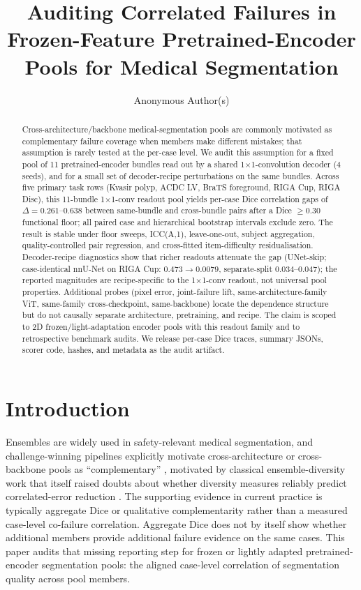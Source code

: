 \documentclass{article}
\title{Auditing Correlated Failures in Frozen-Feature Pretrained-Encoder Pools for Medical Segmentation}
\author{Anonymous Author(s)}
\begin{document}
\maketitle

\begin{abstract}
Cross-architecture/backbone medical-segmentation pools are commonly motivated as complementary failure coverage when members make different mistakes; that assumption is rarely tested at the per-case level. We audit this assumption for a fixed pool of 11 pretrained-encoder bundles read out by a shared 1$\times$1-convolution decoder (4 seeds), and for a small set of decoder-recipe perturbations on the same bundles. Across five primary task rows (Kvasir polyp, ACDC LV, BraTS foreground, RIGA Cup, RIGA Disc), this 11-bundle 1$\times$1-conv readout pool yields per-case Dice correlation gaps of $\Delta=0.261$--$0.638$ between same-bundle and cross-bundle pairs after a Dice $\geq 0.30$ functional floor; all paired case and hierarchical bootstrap intervals exclude zero. The result is stable under floor sweeps, ICC(A,1), leave-one-out, subject aggregation, quality-controlled pair regression, and cross-fitted item-difficulty residualisation. Decoder-recipe diagnostics show that richer readouts attenuate the gap (UNet-skip; case-identical nnU-Net on RIGA Cup: $0.473\!\to\!0.0079$, separate-split $0.034$--$0.047$); the reported magnitudes are recipe-specific to the 1$\times$1-conv readout, not universal pool properties. Additional probes (pixel error, joint-failure lift, same-architecture-family ViT, same-family cross-checkpoint, same-backbone) locate the dependence structure but do not causally separate architecture, pretraining, and recipe. The claim is scoped to 2D frozen/light-adaptation encoder pools with this readout family and to retrospective benchmark audits. We release per-case Dice traces, summary JSONs, scorer code, hashes, and metadata as the audit artifact.
\end{abstract}

\section{Introduction}

Ensembles are widely used in safety-relevant medical segmentation, and challenge-winning pipelines explicitly motivate cross-architecture or cross-backbone pools as ``complementary'' \citep{ferreira2024brats,luo2025elf}, motivated by classical ensemble-diversity work that itself raised doubts about whether diversity measures reliably predict correlated-error reduction \citep{kuncheva2003diversity}. The supporting evidence in current practice is typically aggregate Dice or qualitative complementarity rather than a measured case-level co-failure correlation. Aggregate Dice does not by itself show whether additional members provide additional failure evidence on the same cases. This paper audits that missing reporting step for frozen or lightly adapted pretrained-encoder segmentation pools: the aligned case-level correlation of segmentation quality across pool members.
\end{document}
